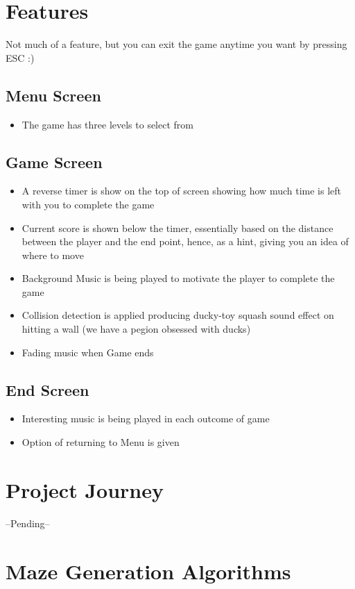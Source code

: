 \documentclass{article}
\begin{document}
\section{Features}
Not much of a feature, but you can exit the game anytime you want by pressing ESC :)\\
\subsection*{Menu Screen}
\begin{itemize}
    \item The game has three levels to select from
\end{itemize}
\subsection*{Game Screen}
\begin{itemize}
    \item A reverse timer is show on the top of screen showing how much time is left with you to complete the game
    \item Current score is shown below the timer, essentially based on the distance between the player and the end point, hence, as a hint, giving you an idea of where to move
    \item Background Music is being played to motivate the player to complete the game
    \item Collision detection is applied producing ducky-toy squash sound effect on hitting a wall (we have a pegion obsessed with ducks)
    \item Fading music when Game ends
\end{itemize}
\subsection*{End Screen}
\begin{itemize}
    \item Interesting music is being played in each outcome of game
    \item Option of returning to Menu is given
\end{itemize}
\section{Project Journey}
--Pending--

\section{Maze Generation Algorithms}
\end{document}
